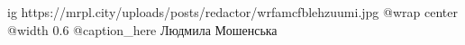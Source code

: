  
 
 
 
 

\ifcmt
  ig https://mrpl.city/uploads/posts/redactor/wrfamcfblehzuumi.jpg
  @wrap center
  @width 0.6
  @caption_here Людмила Мошенська
\fi
